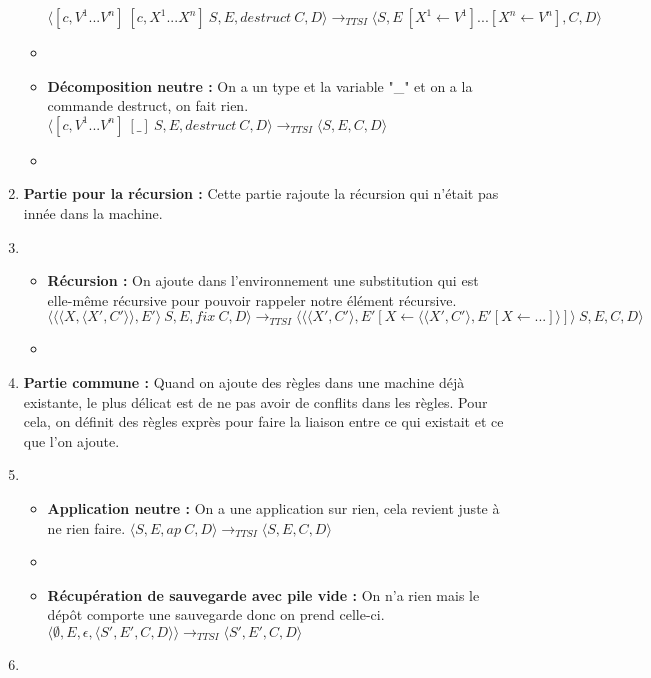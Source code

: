 \documentclass[10pt,a4paper]{report}
\begin{document}
\begin{enumerate}
\begin{itemize}
			\smallbreak
			$\langle [c,V^{1}...V^{n}]~[c,X^{1}...X^{n}]~S,E,destruct~C,D\rangle
			\longrightarrow_{TTSI} \langle S,E~[X^{1} \leftarrow V^{1}]...[X^{n} \leftarrow V^{n}],C,D\rangle$ 
			\item[]
			\item[] \textbf{Décomposition neutre :} On a un type et la variable "\_" et on a la commande destruct, on fait rien.
			\smallbreak
			$\langle [c,V^{1}...V^{n}]~[\_]~S,E,destruct~C,D\rangle
			\longrightarrow_{TTSI} \langle S,E,C,D\rangle$ 
			\item[]
		\end{itemize}
		\item[] \textbf{Partie pour la récursion :} Cette partie rajoute la récursion qui n'était pas innée dans la machine.
		\item[]
		\begin{itemize}
			\item[] \textbf{Récursion :} On ajoute dans l'environnement une substitution qui est elle-même récursive pour pouvoir rappeler notre élément récursive.
			\smallbreak
			$\langle \langle\langle X,\langle X',C'\rangle\rangle,E'\rangle~S,E,fix~C,D\rangle
			\longrightarrow_{TTSI} \langle \langle\langle X',C'\rangle,E' [X \leftarrow \langle\langle X',C'\rangle,E'[X \leftarrow ...]\rangle]\rangle~S,E,C,D\rangle$ 
			\item[]
		\end{itemize}
		\item[] \textbf{Partie commune :} Quand on ajoute des règles dans une machine déjà existante, le plus délicat est de ne pas avoir de conflits dans les règles. Pour cela, on définit des règles exprès pour faire la liaison entre ce qui existait et ce que l'on ajoute. 
		\item[]
		\begin{itemize}
			\item[] \textbf{Application neutre :} On a une application sur rien, cela revient juste à ne rien faire.
			\smallbreak 
			$\langle S,E,ap~C,D\rangle
			\longrightarrow_{TTSI} 
			\langle S,E,C,D\rangle$
			\item[]
			\item[] \textbf{Récupération de sauvegarde avec pile vide :}  On n'a rien mais le dépôt comporte une sauvegarde donc on prend celle-ci.
			\smallbreak  
			$\langle \emptyset,E,\epsilon,\langle S',E',C,D\rangle\rangle
			\longrightarrow_{TTSI} 
			\langle S',E',C,D\rangle$
		\end{itemize}
		
		\item[]
	\end{enumerate}
	\bigbreak
	\bigbreak
	
\end{document}
